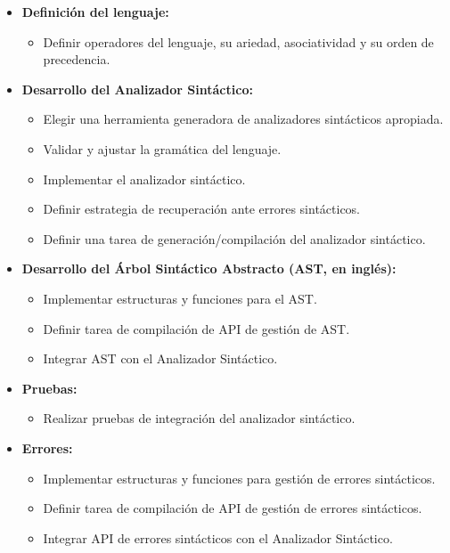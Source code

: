 \begin{itemize}
    \item \textbf{Definición del lenguaje:}
    \begin{itemize}
        \item Definir operadores del lenguaje, su ariedad, asociatividad y su orden de precedencia.
    \end{itemize}
    
    \item \textbf{Desarrollo del Analizador Sintáctico:}
    \begin{itemize}
        \item Elegir una herramienta generadora de analizadores sintácticos apropiada.
        \item Validar y ajustar la gramática del lenguaje.
        \item Implementar el analizador sintáctico.
        \item Definir estrategia de recuperación ante errores sintácticos.
        \item Definir una tarea de generación/compilación del analizador sintáctico.
    \end{itemize}
    
    \item \textbf{Desarrollo del Árbol Sintáctico Abstracto (AST, en inglés):}
    \begin{itemize}
        \item Implementar estructuras y funciones para el AST.
        \item Definir tarea de compilación de API de gestión de AST.
        \item Integrar AST con el Analizador Sintáctico.
    \end{itemize}

    \item \textbf{Pruebas:}
    \begin{itemize}
        \item Realizar pruebas de integración del analizador sintáctico.
    \end{itemize}

    \item \textbf{Errores:}
    \begin{itemize}
        \item Implementar estructuras y funciones para gestión de errores sintácticos.
        \item Definir tarea de compilación de API de gestión de errores sintácticos.
        \item Integrar API de errores sintácticos con el Analizador Sintáctico.
    \end{itemize}


\end{itemize}
